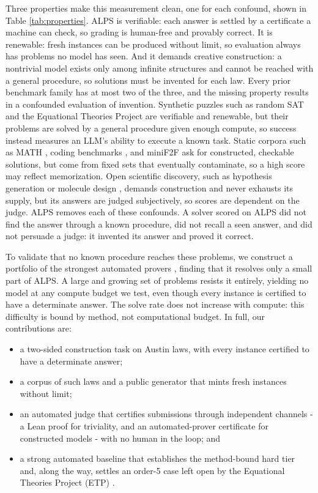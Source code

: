 \documentclass[letterpaper]{article} %
\begin{document}
Three properties make this measurement clean, one for each confound, shown in Table \ref{tab:properties}. ALPS is verifiable: each answer is settled by a certificate a machine can check, so grading is human-free and provably correct. It is renewable: fresh instances can be produced without limit, so evaluation always has problems no model has seen. And it demands creative construction: a nontrivial model exists only among infinite structures and cannot be reached with a general procedure, so solutions must be invented for each law. Every prior benchmark family has at most two of the three, and the missing property results in a confounded evaluation of invention. Synthetic puzzles such as random SAT \citep{selman1996generating} and the Equational Theories Project \citep{bolan2025equational} are verifiable and renewable, but their problems are solved by a general procedure given enough compute, so success instead measures an LLM's ability to execute a known task. Static corpora such as MATH \citep{hendrycks2021measuring}, coding benchmarks \citep{chen2021evaluating}, and miniF2F \citep{zheng2021minif2f} ask for constructed, checkable solutions, but come from fixed sets that eventually contaminate, so a high score may reflect memorization. Open scientific discovery, such as hypothesis generation \citep{gottweis2026accelerating, lu2024ai} or molecule design \citep{jumper2021highly}, demands construction and never exhausts its supply, but its answers are judged subjectively, so scores are dependent on the judge. ALPS removes each of these confounds. A solver scored on ALPS did not find the answer through a known procedure, did not recall a seen answer, and did not persuade a judge: it invented its answer and proved it correct. 




To validate that no known procedure reaches these problems, we construct a portfolio of the strongest automated provers \citep{kovacs2013first, schulz2019faster, smallbone2021twee}, finding that it resolves only a small part of ALPS. A large and growing set of problems resists it entirely, yielding no model at any compute budget we test, even though every instance is certified to have a determinate answer. The solve rate does not increase with compute: this difficulty is bound by method, not computational budget. In full, our contributions are:
\begin{itemize}
\item a two-sided construction task on Austin laws, with every instance certified to have a determinate answer;
\item a corpus of such laws and a public generator that mints fresh instances without limit;
\item an automated judge that certifies submissions through independent channels - a Lean proof \citep{moura2021lean} for triviality, and an automated-prover certificate \citep{kovacs2013first} for constructed models - with no human in the loop; and
\item a strong automated baseline that establishes the method-bound hard tier and, along the way, settles an order-5 case left open by the Equational Theories Project (ETP) \citep{bolan2025equational}.
\end{itemize}
\end{document}
